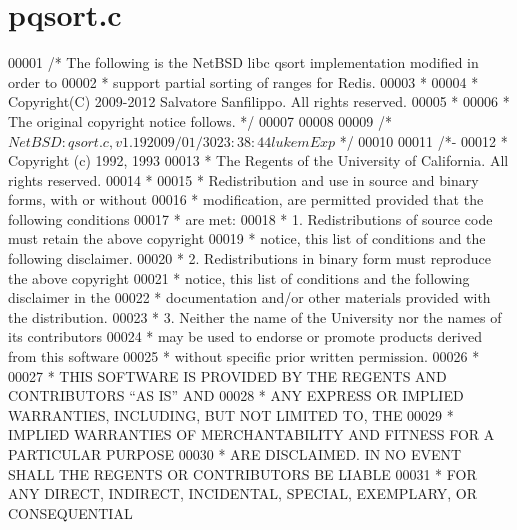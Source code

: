 \hypertarget{pqsort_8c_source}{}\section{pqsort.\+c}
\label{pqsort_8c_source}

\begin{DoxyCode}
00001 \textcolor{comment}{/* The following is the NetBSD libc qsort implementation modified in order to}
00002 \textcolor{comment}{ * support partial sorting of ranges for Redis.}
00003 \textcolor{comment}{ *}
00004 \textcolor{comment}{ * Copyright(C) 2009-2012 Salvatore Sanfilippo. All rights reserved.}
00005 \textcolor{comment}{ *}
00006 \textcolor{comment}{ * The original copyright notice follows. */}
00007 
00008 
00009 \textcolor{comment}{/*  $NetBSD: qsort.c,v 1.19 2009/01/30 23:38:44 lukem Exp $ */}
00010 
00011 \textcolor{comment}{/*-}
00012 \textcolor{comment}{ * Copyright (c) 1992, 1993}
00013 \textcolor{comment}{ *  The Regents of the University of California.  All rights reserved.}
00014 \textcolor{comment}{ *}
00015 \textcolor{comment}{ * Redistribution and use in source and binary forms, with or without}
00016 \textcolor{comment}{ * modification, are permitted provided that the following conditions}
00017 \textcolor{comment}{ * are met:}
00018 \textcolor{comment}{ * 1. Redistributions of source code must retain the above copyright}
00019 \textcolor{comment}{ *    notice, this list of conditions and the following disclaimer.}
00020 \textcolor{comment}{ * 2. Redistributions in binary form must reproduce the above copyright}
00021 \textcolor{comment}{ *    notice, this list of conditions and the following disclaimer in the}
00022 \textcolor{comment}{ *    documentation and/or other materials provided with the distribution.}
00023 \textcolor{comment}{ * 3. Neither the name of the University nor the names of its contributors}
00024 \textcolor{comment}{ *    may be used to endorse or promote products derived from this software}
00025 \textcolor{comment}{ *    without specific prior written permission.}
00026 \textcolor{comment}{ *}
00027 \textcolor{comment}{ * THIS SOFTWARE IS PROVIDED BY THE REGENTS AND CONTRIBUTORS ``AS IS'' AND}
00028 \textcolor{comment}{ * ANY EXPRESS OR IMPLIED WARRANTIES, INCLUDING, BUT NOT LIMITED TO, THE}
00029 \textcolor{comment}{ * IMPLIED WARRANTIES OF MERCHANTABILITY AND FITNESS FOR A PARTICULAR PURPOSE}
00030 \textcolor{comment}{ * ARE DISCLAIMED.  IN NO EVENT SHALL THE REGENTS OR CONTRIBUTORS BE LIABLE}
00031 \textcolor{comment}{ * FOR ANY DIRECT, INDIRECT, INCIDENTAL, SPECIAL, EXEMPLARY, OR CONSEQUENTIAL}

\end{DoxyCode}
